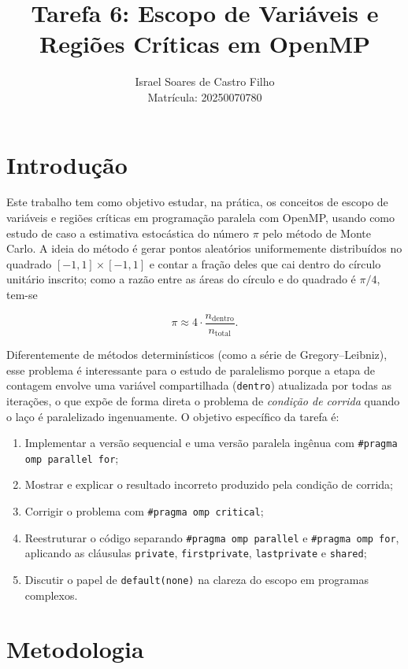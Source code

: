 \documentclass[a4paper,12pt]{article}
\title{Tarefa 6: Escopo de Variáveis e Regiões Críticas em OpenMP}
\author{Israel Soares de Castro Filho \\ Matrícula: 20250070780}
\date{}
\begin{document}
\maketitle

\section{Introdução}

Este trabalho tem como objetivo estudar, na prática, os conceitos de escopo de variáveis e regiões críticas em programação paralela com OpenMP, 
usando como estudo de caso a estimativa estocástica do número $\pi$ pelo método de Monte Carlo. A ideia do método é gerar pontos aleatórios uniformemente distribuídos 
no quadrado $[-1,1]\times[-1,1]$ e contar a fração deles que cai dentro do círculo unitário inscrito; como a razão entre as áreas do círculo e do quadrado é $\pi/4$, tem-se

\[
\pi \approx 4 \cdot \frac{n_{\text{dentro}}}{n_{\text{total}}}.
\]

Diferentemente de métodos determinísticos (como a série de Gregory--Leibniz), 
esse problema é interessante para o estudo de paralelismo porque a etapa de contagem envolve uma variável compartilhada 
(\texttt{dentro}) atualizada por todas as iterações, o que expõe de forma direta o problema de \emph{condição de corrida} 
quando o laço é paralelizado ingenuamente. O objetivo específico da tarefa é: 

\begin{enumerate}
    \item Implementar a versão sequencial e uma versão paralela ingênua com \texttt{\#pragma omp parallel for};
    \item Mostrar e explicar o resultado incorreto produzido pela condição de corrida;
    \item Corrigir o problema com \texttt{\#pragma omp critical};
    \item Reestruturar o código separando \texttt{\#pragma omp parallel} e \texttt{\#pragma omp for}, aplicando as cláusulas \texttt{private}, \texttt{firstprivate}, \texttt{lastprivate} e \texttt{shared};
    \item Discutir o papel de \texttt{default(none)} na clareza do escopo em programas complexos.
\end{enumerate}

\section{Metodologia}
\end{document}
